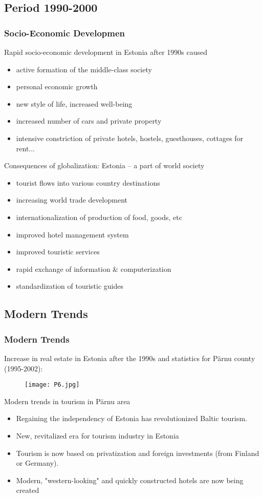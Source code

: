 \documentclass[pdflatex,compress,8pt,
	xcolor={dvipsnames,dvipsnames,svgnames,x11names,table},
	hyperref={	
	breaklinks = true, 
	pdfauthor={Lemenkova Polina}, 
	pdfsubject={Preentation}, 
	pdfcreator={Lemenkova Polina}, 
	pdfproducer={Lemenkova Polina}, 
	colorlinks=true,
	linkcolor=Tomato, 
	citecolor=DeepPink3, 
	urlcolor = NavyBlue, 
	breaklinks = true}]{beamer}
\begin{document}
\subsection{Period 1990-2000}
\begin{frame}\frametitle{Socio-Economic Developmen}
\vspace{3em}
Rapid socio-economic development in Estonia after 1990s caused
\begin{itemize}
	\item active formation of the middle-class society
	\item personal economic growth
	\item new style of life, increased well-being
	\item increased number of cars and private property
	\item intensive constriction of private hotels, hostels, guesthouses, cottages for rent...
\end{itemize}
Consequences of globalization: Estonia – a part of world society
\begin{itemize}
	\item tourist flows into various country destinations
	\item increasing world trade development
	\item internationalization of production of food, goods, etc 
	\item improved hotel management system
	\item improved touristic services
	\item rapid exchange of information \& computerization
	\item standardization of touristic guides
\end{itemize}
\end{frame} 

\subsection{Modern Trends}
\begin{frame}\frametitle{Modern Trends}
Increase in real estate in Estonia after the 1990s and statistics for Pärnu county (1995-2002):
\begin{figure}[H]
	\centering
		\texttt{[image: P6.jpg]}
\end{figure}
Modern trends in tourism in Pärnu area
\begin{itemize}
	\item Regaining the independency of Estonia has revolutionized Baltic tourism.
	\item New, revitalized era for tourism industry in Estonia
	\item Tourism is now based on privatization and foreign investments (from Finland or Germany).
	\item Modern, "western-looking" and quickly constructed hotels are now being created
\end{itemize}
\end{frame} 
\end{document}
